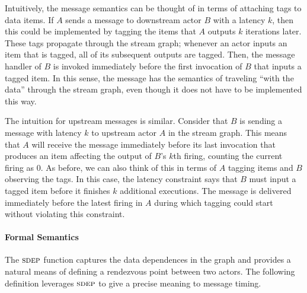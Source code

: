Intuitively, the message semantics can be thought of in terms of
attaching tags to data items.  If $A$ sends a message to downstream
actor $B$ with a latency $k$, then this could be implemented by
tagging the items that $A$ outputs $k$ iterations later.  These tags
propagate through the stream graph; whenever an actor inputs an item
that is tagged, all of its subsequent outputs are tagged.  Then, the
message handler of $B$ is invoked immediately before the first
invocation of $B$ that inputs a tagged item.  In this sense, the
message has the semantics of traveling ``with the data'' through the
stream graph, even though it does not have to be implemented this way.

The intuition for upstream messages is similar.  Consider that $B$ is
sending a message with latency $k$ to upstream actor $A$ in the stream
graph.  This means that $A$ will receive the message immediately
before its last invocation that produces an item affecting the output
of $B$'s $k$th firing, counting the current firing as 0.  As before,
we can also think of this in terms of $A$ tagging items and $B$
observing the tags.  In this case, the latency constraint says that
$B$ must input a tagged item before it finishes $k$ additional
executions.  The message is delivered immediately before the latest
firing in $A$ during which tagging could start without violating this
constraint.

\paragraph*{Formal Semantics} The $\textsc{sdep}$ function captures the
data dependences in the graph and provides a natural means of defining
a rendezvous point between two actors.  The following definition
leverages $\textsc{sdep}$ to give a precise meaning to message timing.

